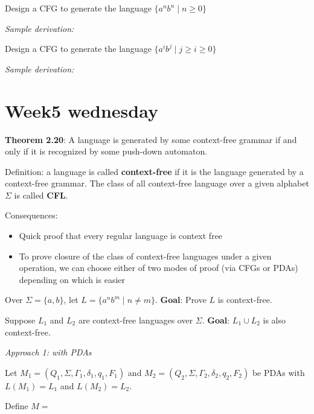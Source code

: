 \documentclass[12pt, oneside]{article}
\begin{document}
  Design a CFG to generate the  language $\{a^n b^n \mid  n  \geq  0\}$
  
  \vspace{150pt}
  
  {\it Sample derivation:} 
  
  \vspace{30pt}
  
  
  Design a CFG to generate the  language $\{a^i b^j \mid j \geq i  \geq 0\}$
  
  \vspace{150pt}
  
  {\it Sample derivation:} 
  
  \vspace{30pt}
 \vfill
\section*{Week5 wednesday}


{\bf Theorem  2.20}: A language is  generated by some context-free  grammar
if  and only if it is recognized by some push-down automaton.

Definition: a language is called {\bf context-free} if it is the language generated by a context-free grammar.
The class of all context-free language over a given alphabet $\Sigma$ is called {\bf CFL}.

Consequences:
\begin{itemize}
    \item Quick proof that every regular language is context free 
    \item To prove closure of the class of context-free languages under a given operation, we can choose 
    either of two modes 
    of proof (via CFGs or PDAs) depending on which is easier
\end{itemize}


Over $\Sigma = \{a,b\}$, let $L = \{ a^n b^m \mid n  \neq m \}$. {\bf Goal}: Prove $L$ is context-free.


\vfill

\newpage
Suppose $L_1$ and $L_2$ are context-free languages over $\Sigma$.  {\bf Goal}:  $L_1 \cup L_2$  is  also context-free.

{\it Approach 1: with  PDAs}

Let $M_1 = ( Q_1, \Sigma, \Gamma_1, \delta_1, q_1, F_1)$ and
$M_2 = ( Q_2, \Sigma, \Gamma_2, \delta_2, q_2, F_2)$ be PDAs with 
$L(M_1) =  L_1$  and  $L(M_2) = L_2$.

Define $M = $

\vfill
\end{document}

